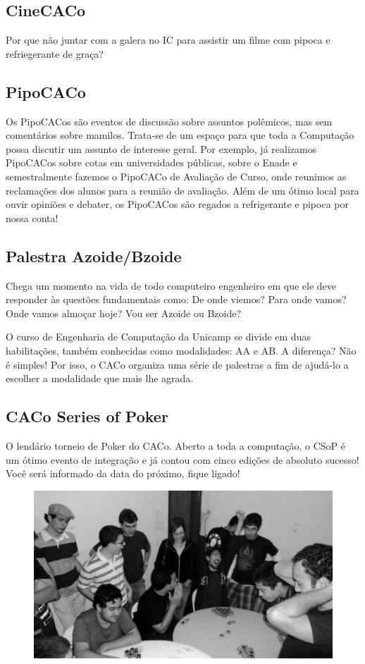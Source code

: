 \subsection{CineCACo}

Por que não juntar com a galera no IC para assistir um filme com pipoca e
refriegerante de graça?

\subsection{PipoCACo}

Os PipoCACos são eventos de discussão sobre assuntos polêmicos, mas sem
comentários sobre  mamilos. Trata-se de um espaço para que toda a Computação
possa discutir um assunto de interesse geral. Por exemplo, já realizamos
PipoCACos sobre cotas em universidades públicas, sobre o Enade e semestralmente
fazemos o PipoCACo de Avaliação de Curso, onde reunimos as reclamações dos
alunos para a reunião de avaliação. Além de um ótimo local para ouvir opiniões e
debater, os PipoCACos são regados a refrigerante e pipoca por nossa conta!

\subsection{Palestra Azoide/Bzoide}

Chega um momento na vida de todo computeiro engenheiro em que ele deve responder
às questões fundamentais como: De onde viemos? Para onde vamos? Onde vamos
almoçar hoje? Vou ser Azoide ou Bzoide?

O curso de Engenharia de Computação da Unicamp se divide em duas habilitações,
também conhecidas como modalidades: AA e AB. A diferença? Não é simples! Por
isso, o CACo organiza uma série de palestras a fim de ajudá-lo a escolher a
modalidade que mais lhe agrada.

\subsection{CACo Series of Poker}

O lendário torneio de Poker do CACo. Aberto a toda a computação, o CSoP é um
ótimo evento de integração e já contou com cinco edições de absoluto sucesso!
Você será informado da data do próximo, fique ligado!

\begin{figure}[H]
    \centering
    \includegraphics[scale=0.21]{img/alem_da_graduacao/caco_poker2.jpg}
\end{figure}


